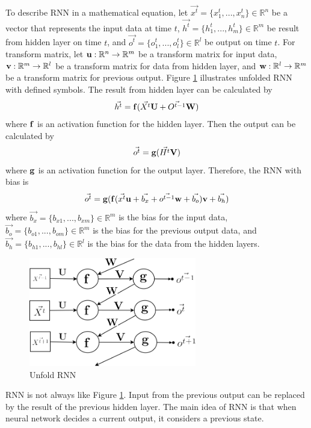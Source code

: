 \documentclass[draft,dvipsnames]{drexel-thesis}
\begin{document}
\begin{thesis}
	To describe RNN in a mathematical equation, let $\vec{x^t} = \{ x_1^t, ..., x_n^t\} \in \mathbb{R}^n$ be a vector that represents the input data at time $t$, $\vec{h^t} = \{ h_1^t, ..., h_m^t\} \in \mathbb{R}^m$ be result from hidden layer on time $t$, and $\vec{o^t} = \{ o_1^t, ..., o_l^t\} \in \mathbb{R}^l$ be output on time $t$. For transform matrix, let $\bold{u}: \mathbb{R}^n \rightarrow \mathbb{R}^m$ be a transform matrix for input data, $\bold{v}: \mathbb{R}^m \rightarrow \mathbb{R}^l$ be a transform matrix for data from hidden layer, and $\bold{w}: \mathbb{R}^l \rightarrow \mathbb{R}^m$ be a transform matrix for previous output. Figure \ref{fig:unfold_RNN} illustrates unfolded RNN with defined symbols. The result from hidden layer can be calculated by
	$$\vec{h^t} = \bold{f}(\vec{X^t}\bold{U} + \vec{O^{t-1}}\bold{W})$$ where $\bold{f}$ is an activation function for the hidden layer. Then the output can be calculated by
	$$\vec{o^t} = \bold{g}(\vec{H^t}\bold{V})$$ where $\bold{g}$ is an activation function for the output layer. Therefore, the RNN with bias is
	$$\vec{o^t} = \bold{g}(\bold{f}(\vec{x^t}\bold{u}+\vec{b_x} + \vec{o^{t-1}}\bold{w}+\vec{b_o})\bold{v}+\vec{b_h})$$ where $\vec{b_x} = \{b_{x1}, ..., b_{xm}\} \in \mathbb{R}^m$ is the bias for the input data, $\vec{b_o} = \{b_{o1}, ..., b_{om}\} \in \mathbb{R}^m$ is the bias for the previous output data, and $\vec{b_h} = \{b_{h1}, ..., b_{hl}\} \in \mathbb{R}^l$ is the bias for the data from the hidden layers.

\begin{figure}[t!]
    \centering
    \includegraphics[width=0.65\textwidth]{pictures/figures/unfold_RNN.png}
    \caption{Unfold RNN}
    \label{fig:unfold_RNN}
\end{figure}

	RNN is not always like Figure \ref{fig:unfold_RNN}. Input from the previous output can be replaced by the result of the previous hidden layer. The main idea of RNN is that when neural network decides a current output, it considers a previous state.



\end{thesis}
\end{document}
